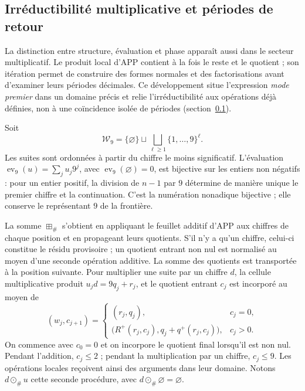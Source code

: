\subsection{Irréductibilité multiplicative et périodes de retour}
\label{primos-retornos}

La distinction entre structure, évaluation et phase apparaît aussi dans le
secteur multiplicatif. Le produit local d’APP contient à la fois le reste
et le quotient ; son itération permet de construire des formes normales et
des factorisations avant d’examiner leurs périodes décimales. Ce développement
situe l’expression \emph{mode premier} dans un domaine précis et relie
l’irréductibilité aux opérations déjà définies, non à une coïncidence
isolée de périodes (section~\ref{primos-retornos}).

Soit
\[
 \mathcal W_9=\{\varnothing\}\sqcup
 \bigsqcup_{\ell\geq1}\{1,\ldots,9\}^{\ell}.
\]
Les suites sont ordonnées à partir du chiffre le moins significatif. L'évaluation
\(\operatorname{ev}_9(u)=\sum_j u_j9^j\), avec
\(\operatorname{ev}_9(\varnothing)=0\), est bijective sur les entiers non
négatifs : pour un entier positif, la division de \(n-1\) par \(9\)
détermine de manière unique le premier chiffre et la continuation. C'est la
numération nonadique bijective ; elle conserve le représentant \(9\) de la
frontière.

La somme \(\boxplus_\#\) s'obtient en appliquant le feuillet additif d'APP aux chiffres de chaque position et en propageant leurs quotients. S'il n'y a qu'un chiffre, celui-ci constitue le résidu provisoire ; un quotient entrant non nul est normalisé au moyen d'une seconde opération additive. La somme des quotients est transportée à la position suivante. Pour multiplier une suite par un chiffre \(d\), la cellule multiplicative produit \(u_jd=9q_j+r_j\), et le quotient entrant \(c_j\) est incorporé au moyen de
\[
 (w_j,c_{j+1})=
 \begin{cases}
 (r_j,q_j),&c_j=0,\\
 \bigl(R^+(r_j,c_j),q_j+q^+(r_j,c_j)\bigr),&c_j>0.
 \end{cases}
\]
On commence avec \(c_0=0\) et on incorpore le quotient final lorsqu'il est non
nul. Pendant l'addition, \(c_j\leq2\) ; pendant la multiplication par un chiffre,
\(c_j\leq9\). Les opérations locales reçoivent ainsi des arguments dans
leur domaine. Notons \(d\odot_\#u\) cette seconde procédure,
avec \(d\odot_\#\varnothing=\varnothing\).

